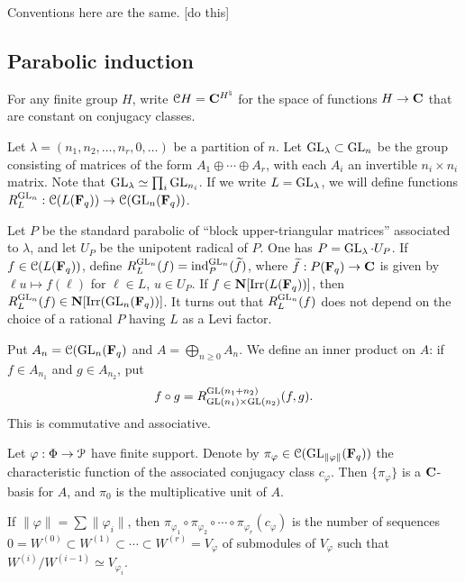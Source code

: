 \documentclass{article}
\begin{document}
\begin{example}[$\generallinear_3(\dF_q)$]
Conventions here are the same. [do this]
\end{example}





\subsection{Parabolic induction}

For any finite group $H$, write $\mathcal{C} H=\mathbf{C}^{H^\natural}$ for the space of 
functions $H\to \mathbf{C}$ that are constant on conjugacy classes. 

Let $\lambda=(n_1,n_2,\dots,n_r,0,\dots)$ be a partition of $n$. 
Let $\operatorname{GL}_\lambda\subset \operatorname{GL}_n$ be the group consisting of 
matrices of the form $A_1\oplus \cdots \oplus A_r$, with each $A_i$ an 
invertible $n_i\times n_i$ matrix. Note that 
$\operatorname{GL}_\lambda\simeq \prod_i \operatorname{GL}_{n_i}$. If we write 
$L=\operatorname{GL}_\lambda$, we will define functions 
$R_L^{\operatorname{GL}_n}:\mathcal{C}(L(\mathbf{F}_q)) \to \mathcal{C}(\operatorname{GL}_n(\mathbf{F}_q))$. 

Let $P$ be the standard parabolic of ``block upper-triangular matrices'' 
associated to $\lambda$, and let $U_P$ be the unipotent radical of $P$. 
One has $P=\operatorname{GL}_\lambda \cdot U_P$. If 
$f\in \mathcal{C}(L(\mathbf{F}_q))$, define 
$R_L^{\operatorname{GL}_n}(f)=\operatorname{ind}_P^{\operatorname{GL}_n}(\widetilde f)$, 
where $\widetilde f:P(\mathbf{F}_q) \to \mathbf{C}$ is given by 
$\ell u\mapsto f(\ell)$ for $\ell\in L$, $u\in U_P$. If 
$f\in \mathbf{N}[\operatorname{Irr}(L(\mathbf{F}_q))]$, then 
$R_L^{\operatorname{GL}_n}(f)\in \mathbf{N}[\operatorname{Irr}(\operatorname{GL}_n(\mathbf{F}_q))]$. 
It turns out that $R_L^{\operatorname{GL}_n}(f)$ does not depend on the choice of 
a rational $P$ having $L$ as a Levi factor. 

Put $A_n = \mathcal{C}(\operatorname{GL}_n(\mathbf{F}_q)$ and $A=\bigoplus_{n\geqslant 0} A_n$. 
We define an inner product on $A$: if 
$f\in A_{n_1}$ and $g\in A_{n_2}$, put 
\[
  f\circ g = R_{\operatorname{GL}(n_1)\times \operatorname{GL}(n_2)}^{\operatorname{GL}(n_1+n_2)}(f,g) .
\]
This is commutative and associative.  

Let $\varphi:\Phi\to \mathcal{P}$ have finite support. Denote by 
$\pi_\varphi\in \mathcal{C}(\operatorname{GL}_{\|\varphi\|}(\mathbf{F}_q))$ the characteristic 
function of the associated conjugacy class $c_\varphi$. Then 
$\{\pi_\varphi\}$ is a $\mathbf{C}$-basis for $A$, and $\pi_0$ is the multiplicative 
unit of $A$. 

\begin{lemma}
If $\|\varphi\| = \sum \| \varphi_i\|$, then 
$\pi_{\varphi_1}\circ \pi_{\varphi_2} \circ \cdots \circ \pi_{\varphi_r}(c_\varphi)$ 
is the number of sequences $0=W^{(0)}\subset W^{(1)} \subset \cdots \subset W^{(r)}=V_\varphi$ 
of submodules of $V_\varphi$ such that $W^{(i)}/W^{(i-1)} \simeq V_{\varphi_i}$. 
\end{lemma}
\end{document}

